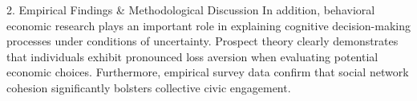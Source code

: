 2. Empirical Findings & Methodological Discussion
In addition, behavioral economic research plays an important role in explaining cognitive decision-making processes under conditions of uncertainty. Prospect theory clearly demonstrates that individuals exhibit pronounced loss aversion when evaluating potential economic choices. Furthermore, empirical survey data confirm that social network cohesion significantly bolsters collective civic engagement.
